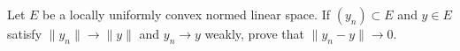 Let $E$ be a locally uniformly convex normed linear space. If $(y_n) \subset E$ and $y \in E$ satisfy $\|y_n\| \to \|y\|$ and $y_n \to y$ weakly, prove that $\|y_n - y\| \to 0$.
